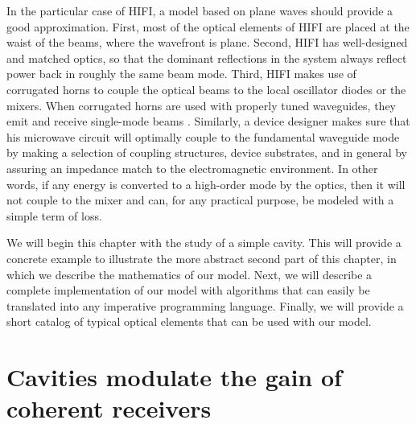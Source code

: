 \begin{refsection}
In the particular case of HIFI, a model based on plane waves should provide a good approximation.
First, most of the optical elements of HIFI are placed at the waist of the beams, where the wavefront is plane.
Second, HIFI has well-designed and matched optics, so that the dominant reflections in the system always reflect power back in roughly the same beam mode.
Third, HIFI makes use of corrugated horns to couple the optical beams to the local oscillator diodes or the mixers.
When corrugated horns are used with properly tuned waveguides, they emit and receive single-mode beams \parencite{clarricoats1966propagation}.
Similarly, a device designer makes sure that his microwave circuit will optimally couple to the fundamental waveguide mode by making a selection of coupling structures, device substrates, and in general by assuring an impedance match to the electromagnetic environment.
In other words, if any energy is converted to a high-order mode by the optics, then it will not couple to the mixer and can, for any practical purpose, be modeled with a simple term of loss.

We will begin this chapter with the study of a simple cavity.
This will provide a concrete example to illustrate the more abstract second part of this chapter, in which we describe the mathematics of our model.
Next, we will describe a complete implementation of our model with algorithms that can easily be translated into any imperative programming language.
Finally, we will provide a short catalog of typical optical elements that can be used with our model.





\FloatBarrier


\section{Cavities modulate the gain of coherent receivers}
\label{sec:from_cavity_to_ripple}
\label{sec:fabry_perot_example}


\end{refsection}

